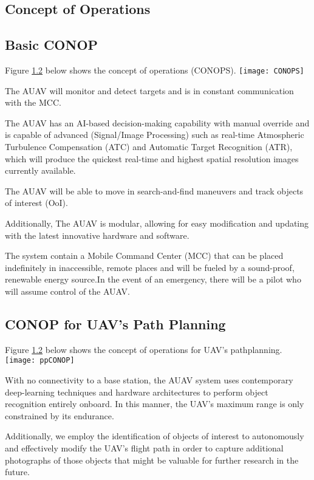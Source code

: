 \begin{fullwidth}
\graphicspath{ {./images/} }
\section{Concept of Operations}
 \subsection{Basic CONOP}
   \begin{center}
    Figure \ref{} below shows the concept of operations (CONOPS).
    \texttt{[image: CONOPS]} 
   \end{center}

The AUAV will monitor and detect targets and is in constant communication with the MCC.

The AUAV has an AI-based decision-making capability with manual override and is capable of advanced (Signal/Image Processing) such as real-time Atmospheric Turbulence Compensation (ATC) and Automatic Target Recognition (ATR), which will produce the quickest real-time and highest spatial resolution images currently available.

The AUAV will be able to move in search-and-find maneuvers and track objects of interest (OoI).

Additionally, The AUAV is modular, allowing for easy modification and updating with the latest innovative hardware and software.

The system contain a Mobile Command Center (MCC) that can be placed indefinitely in inaccessible, remote places and will be fueled by a sound-proof, renewable energy source.In the event of an emergency, there will be a pilot who will assume control of the AUAV.

 \subsection{CONOP for UAV's Path Planning}
 \begin{center}
    Figure \ref{} below shows the concept of operations for UAV's pathplanning.
     \texttt{[image: ppCONOP]}
 \end{center}
 With no connectivity to a base station, the AUAV system uses contemporary deep-learning techniques and hardware architectures to perform object recognition entirely onboard. In this manner, the UAV's maximum range is only constrained by its endurance.
 
 Additionally, we employ the identification of objects of interest to autonomously and effectively modify the UAV's flight path in order to capture additional photographs of those objects that might be valuable for further research in the future. 
 

\end{fullwidth}
